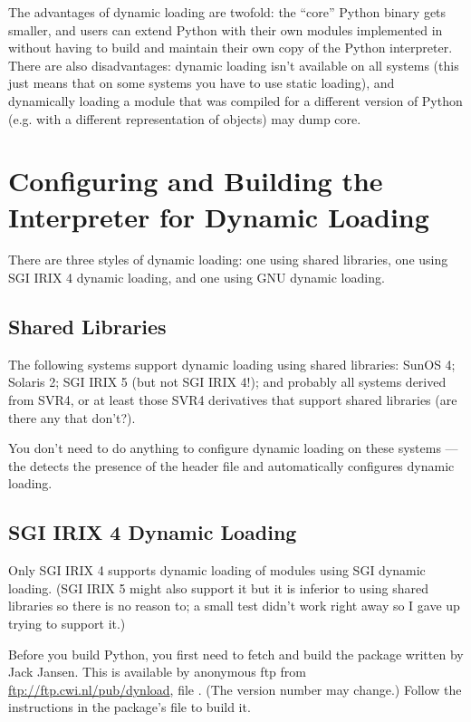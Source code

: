 \documentclass[twoside,openright]{report}
\begin{document}
The advantages of dynamic loading are twofold: the ``core'' Python
binary gets smaller, and users can extend Python with their own
modules implemented in \C{} without having to build and maintain their
own copy of the Python interpreter.  There are also disadvantages:
dynamic loading isn't available on all systems (this just means that
on some systems you have to use static loading), and dynamically
loading a module that was compiled for a different version of Python
(e.g. with a different representation of objects) may dump core.


\section{Configuring and Building the Interpreter for Dynamic Loading}

There are three styles of dynamic loading: one using shared libraries,
one using SGI IRIX 4 dynamic loading, and one using GNU dynamic
loading.

\subsection{Shared Libraries}

The following systems support dynamic loading using shared libraries:
SunOS 4; Solaris 2; SGI IRIX 5 (but not SGI IRIX 4!); and probably all
systems derived from SVR4, or at least those SVR4 derivatives that
support shared libraries (are there any that don't?).

You don't need to do anything to configure dynamic loading on these
systems --- the  detects the presence of the
 header file and automatically configures dynamic
loading.

\subsection{SGI IRIX 4 Dynamic Loading}

Only SGI IRIX 4 supports dynamic loading of modules using SGI dynamic
loading.  (SGI IRIX 5 might also support it but it is inferior to
using shared libraries so there is no reason to; a small test didn't
work right away so I gave up trying to support it.)

Before you build Python, you first need to fetch and build the 
package written by Jack Jansen.  This is available by anonymous ftp
from \url{ftp://ftp.cwi.nl/pub/dynload}, file
.  (The version number may change.)  Follow the
instructions in the package's  file to build it.
\end{document}
